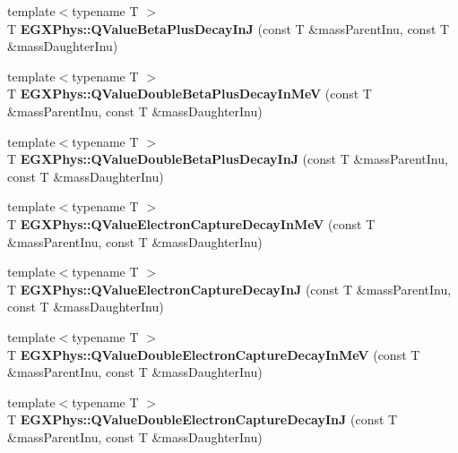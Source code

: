 \begin{DoxyCompactItemize}
\mbox{\label{group___q_value_ga066fe9a9816a204c801c557a85bc60df}} 
{\footnotesize template$<$typename T $>$ }\\T {\bfseries E\+G\+X\+Phys\+::\+Q\+Value\+Beta\+Plus\+Decay\+InJ} (const T \&mass\+Parent\+Inu, const T \&mass\+Daughter\+Inu)
\item 
\mbox{\label{group___q_value_ga3fb4b374bc1df69b96a66d0488bb2ba1}} 
{\footnotesize template$<$typename T $>$ }\\T {\bfseries E\+G\+X\+Phys\+::\+Q\+Value\+Double\+Beta\+Plus\+Decay\+In\+MeV} (const T \&mass\+Parent\+Inu, const T \&mass\+Daughter\+Inu)
\item 
\mbox{\label{group___q_value_ga7d8dcc2691c2d4de9132e758e149ba51}} 
{\footnotesize template$<$typename T $>$ }\\T {\bfseries E\+G\+X\+Phys\+::\+Q\+Value\+Double\+Beta\+Plus\+Decay\+InJ} (const T \&mass\+Parent\+Inu, const T \&mass\+Daughter\+Inu)
\item 
\mbox{\label{group___q_value_ga9a6b76207e2ec60fd0ee3511582f9e26}} 
{\footnotesize template$<$typename T $>$ }\\T {\bfseries E\+G\+X\+Phys\+::\+Q\+Value\+Electron\+Capture\+Decay\+In\+MeV} (const T \&mass\+Parent\+Inu, const T \&mass\+Daughter\+Inu)
\item 
\mbox{\label{group___q_value_ga7b523a7d197beb91dcda75ddde12c851}} 
{\footnotesize template$<$typename T $>$ }\\T {\bfseries E\+G\+X\+Phys\+::\+Q\+Value\+Electron\+Capture\+Decay\+InJ} (const T \&mass\+Parent\+Inu, const T \&mass\+Daughter\+Inu)
\item 
\mbox{\label{group___q_value_ga93e5774784c0d9551e46ba19e1dbc9ab}} 
{\footnotesize template$<$typename T $>$ }\\T {\bfseries E\+G\+X\+Phys\+::\+Q\+Value\+Double\+Electron\+Capture\+Decay\+In\+MeV} (const T \&mass\+Parent\+Inu, const T \&mass\+Daughter\+Inu)
\item 
\mbox{\label{group___q_value_gae25e179b76580bc6af7fa4bdf938ba4e}} 
{\footnotesize template$<$typename T $>$ }\\T {\bfseries E\+G\+X\+Phys\+::\+Q\+Value\+Double\+Electron\+Capture\+Decay\+InJ} (const T \&mass\+Parent\+Inu, const T \&mass\+Daughter\+Inu)

\end{DoxyCompactItemize}
